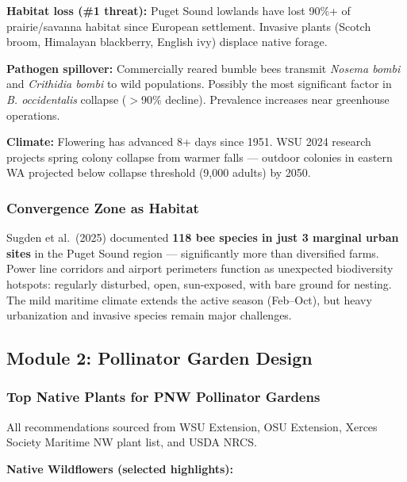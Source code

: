 \documentclass[11pt,letterpaper]{article}
\begin{document}
\textbf{Habitat loss (\#1 threat):} Puget Sound lowlands have lost 90\%+ of prairie/savanna habitat since European settlement. Invasive plants (Scotch broom, Himalayan blackberry, English ivy) displace native forage.

\textbf{Pathogen spillover:} Commercially reared bumble bees transmit \textit{Nosema bombi} and \textit{Crithidia bombi} to wild populations. Possibly the most significant factor in \textit{B. occidentalis} collapse ($>$90\% decline). Prevalence increases near greenhouse operations.

\textbf{Climate:} Flowering has advanced 8+ days since 1951. WSU 2024 research projects spring colony collapse from warmer falls --- outdoor colonies in eastern WA projected below collapse threshold (9,000 adults) by 2050.

\subsubsection{Convergence Zone as Habitat}

Sugden et al.\ (2025) documented \textbf{118 bee species in just 3 marginal urban sites} in the Puget Sound region --- significantly more than diversified farms. Power line corridors and airport perimeters function as unexpected biodiversity hotspots: regularly disturbed, open, sun-exposed, with bare ground for nesting. The mild maritime climate extends the active season (Feb--Oct), but heavy urbanization and invasive species remain major challenges.

\subsection{Module 2: Pollinator Garden Design}

\subsubsection{Top Native Plants for PNW Pollinator Gardens}

All recommendations sourced from WSU Extension, OSU Extension, Xerces Society Maritime NW plant list, and USDA NRCS.

\textbf{Native Wildflowers (selected highlights):}
\end{document}
